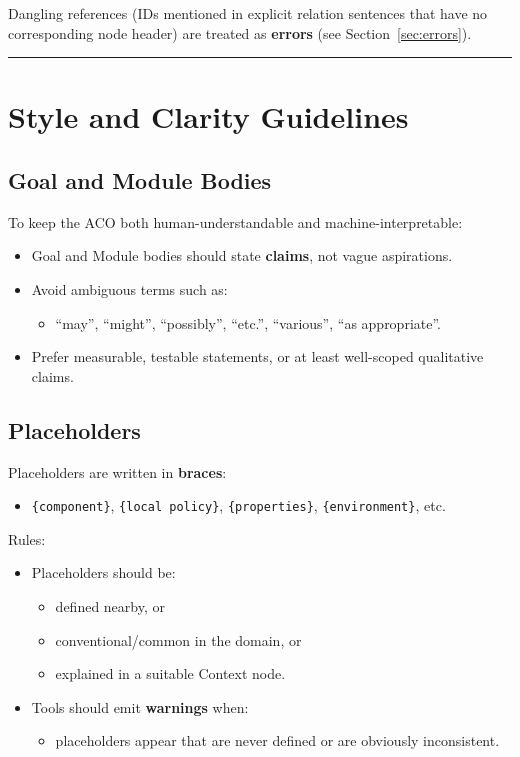 \documentclass[11pt]{article}
\begin{document}
Dangling references (IDs mentioned in explicit relation sentences that have no corresponding node header) are treated as \textbf{errors} (see Section~\ref{sec:errors}).

\bigskip
\hrule
\bigskip

\section{Style and Clarity Guidelines}

\subsection{Goal and Module Bodies}

To keep the ACO both human-understandable and machine-interpretable:
\begin{itemize}[leftmargin=2em]
  \item Goal and Module bodies should state \textbf{claims}, not vague aspirations.
  \item Avoid ambiguous terms such as:
  \begin{itemize}[leftmargin=1.5em]
    \item ``may'', ``might'', ``possibly'', ``etc.'', ``various'', ``as appropriate''.
  \end{itemize}
  \item Prefer measurable, testable statements, or at least well-scoped qualitative claims.
\end{itemize}

\subsection{Placeholders}

Placeholders are written in \textbf{braces}:
\begin{itemize}[leftmargin=2em]
  \item \texttt{\{component\}}, \texttt{\{local policy\}}, \texttt{\{properties\}}, \texttt{\{environment\}}, etc.
\end{itemize}

Rules:
\begin{itemize}[leftmargin=2em]
  \item Placeholders should be:
  \begin{itemize}[leftmargin=1.5em]
    \item defined nearby, or
    \item conventional/common in the domain, or
    \item explained in a suitable Context node.
  \end{itemize}
  \item Tools should emit \textbf{warnings} when:
  \begin{itemize}[leftmargin=1.5em]
    \item placeholders appear that are never defined or are obviously inconsistent.
  \end{itemize}
\end{itemize}
\end{document}
